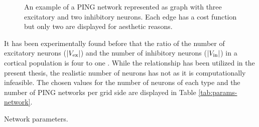 \begin{figure}[!htp]
    \centering
    
    \caption[PING network represented as graph]{An example of a PING network represented as graph with three excitatory and two inhibitory neurons. Each edge has a cost function but only two are displayed for aesthetic reasons.}
    \label{fig:single-ping-graph}
\end{figure}

It has been experimentally found before that the ratio of the number of excitatory neurons ($|V_{\mathrm{ex}}|$) and the number of inhibitory neurons ($|V_{\mathrm{in}}|$) in a cortical population is four to one \cite{Pastore2018}. While the relationship has been utilized in the present thesis, the realistic number of neurons has not as it is computationally infeasible. The chosen values for the number of neurons of each type and the number of PING networks per grid side are displayed in Table \ref{tab:params-network}.

\begin{table}[!htp]
    \centering
    
    \caption{Network parameters.}
    \label{tab:params-network}
\end{table}